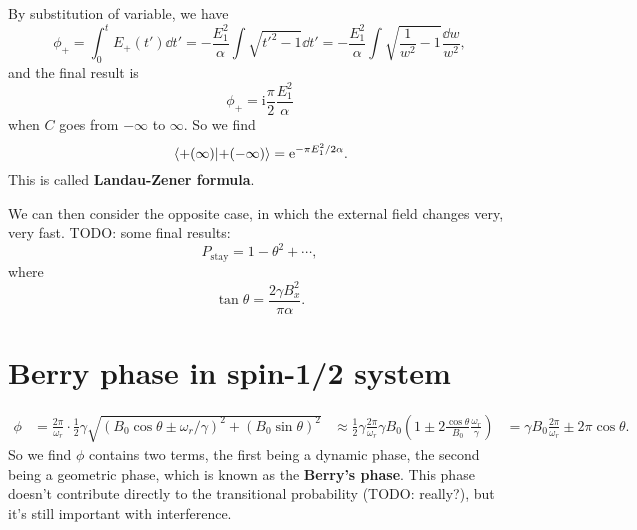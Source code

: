 \documentclass[hyperref, a4paper]{article}
\newcommand*{\ii}{\mathrm{i}}
\newcommand*{\ee}{\mathrm{e}}
\newcommand*{\concept}[1]{{\textbf{#1}}}
\def\\{}%
\begin{document}
By substitution of variable, 
we have 
\begin{equation}
    \phi_+ = \int_{0}^{t} E_+(t') \dd{t'}
    = - \frac{E_1^2}{\alpha} \int \sqrt{t'^2 - 1} \dd{t'}
    = - \frac{E_1^2}{\alpha} \int \sqrt{\frac{1}{w^2} - 1} \frac{\dd{w}}{w^2} ,
\end{equation}
and the final result is 
\begin{equation}
    \phi_+ = \ii \frac{\pi}{2} \frac{E_1^2}{\alpha}
\end{equation} 
when $C$ goes from $-\infty$ to $\infty$.
So we find 
\begin{equation}
    \braket*{+(\infty)}{+(-\infty)} = \ee^{- \pi E_1^2 / 2 \alpha}.
\end{equation}
This is called \concept{Landau-Zener formula}.

We can then consider the opposite case, 
in which the external field changes very, very fast. 
TODO: some final results: 
\begin{equation}
    P_{\text{stay}} = 1 - \theta^2 + \cdots,
\end{equation}
where 
\begin{equation}
    \tan \theta = \frac{2 \gamma B_x^2}{\pi \alpha}.
\end{equation}

\section{Berry phase in spin-1/2 system}

\begin{equation}
    \begin{aligned}
        \phi &= \frac{2\pi}{\omega_r} \cdot \frac{1}{2} \gamma \sqrt{
            (B_0 \cos \theta \pm \omega_r / \gamma)^2
            + (B_0 \sin \theta)^2
        } \\
        &\approx \frac{1}{2} \gamma \frac{2\pi}{\omega_r} \gamma B_0 
        \left( 1 \pm 2 \frac{\cos \theta}{B_0} \frac{\omega_r}{\gamma} \right) \\
        &= \gamma B_0 \frac{2\pi}{\omega_r} \pm 2 \pi \cos \theta.
    \end{aligned}
\end{equation}
So we find $\phi$ contains two terms, 
the first being a dynamic phase, 
the second being a geometric phase, 
which is known as the \concept{Berry's phase}.
This phase doesn't contribute directly to the transitional probability (TODO: really?), 
but it's still important with interference.
\end{document}
